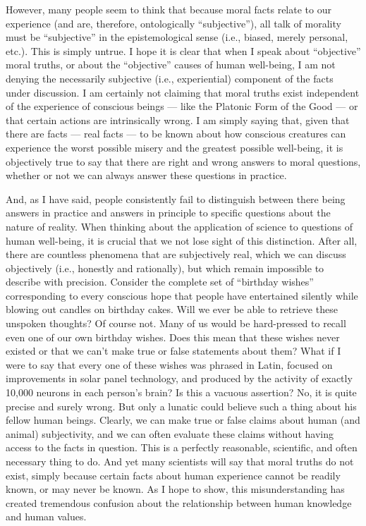 \documentclass[a4paper,14pt]{extarticle}
\begin{document}
However, many people seem to think that because moral facts relate to our experience (and are, therefore, ontologically ``subjective''), all talk of morality must be ``subjective'' in the epistemological sense (i.e., biased, merely personal, etc.).
This is simply untrue.
I hope it is clear that when I speak about ``objective'' moral truths, or about the ``objective'' causes of human well-being, I am not denying the necessarily subjective (i.e., experiential) component of the facts under discussion.
I am certainly not claiming that moral truths exist independent of the experience of conscious beings --- like the Platonic Form of the Good --- or that certain actions are intrinsically wrong.
I am simply saying that, given that there are facts --- real facts --- to be known about how conscious creatures can experience the worst possible misery and the greatest possible well-being, it is objectively true to say that there are right and wrong answers to moral questions, whether or not we can always answer these questions in practice.

And, as I have said, people consistently fail to distinguish between there being answers in practice and answers in principle to specific questions about the nature of reality.
When thinking about the application of science to questions of human well-being, it is crucial that we not lose sight of this distinction.
After all, there are countless phenomena that are subjectively real, which we can discuss objectively (i.e., honestly and rationally), but which remain impossible to describe with precision.
Consider the complete set of ``birthday wishes'' corresponding to every conscious hope that people have entertained silently while blowing out candles on birthday cakes.
Will we ever be able to retrieve these unspoken thoughts?
Of course not.
Many of us would be hard-pressed to recall even one of our own birthday wishes.
Does this mean that these wishes never existed or that we can't make true or false statements about them?
What if I were to say that every one of these wishes was phrased in Latin, focused on improvements in solar panel technology, and produced by the activity of exactly 10,000 neurons in each person's brain?
Is this a vacuous assertion?
No, it is quite precise and surely wrong.
But only a lunatic could believe such a thing about his fellow human beings.
Clearly, we can make true or false claims about human (and animal) subjectivity, and we can often evaluate these claims without having access to the facts in question.
This is a perfectly reasonable, scientific, and often necessary thing to do.
And yet many scientists will say that moral truths do not exist, simply because certain facts about human experience cannot be readily known, or may never be known.
As I hope to show, this misunderstanding has created tremendous confusion about the relationship between human knowledge and human values.
\end{document}
